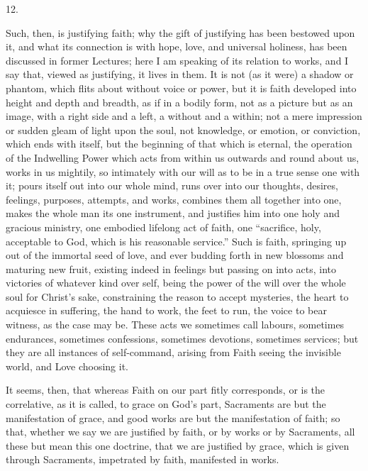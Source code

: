 12.

Such, then, is justifying faith; why the gift of justifying has
been bestowed upon it, and what its connection is with hope,
love, and universal holiness, has been discussed in former Lectures;
here I am speaking of its relation to works, and I say that, viewed as
justifying, it lives in them. It is not (as it were) a shadow or
phantom, which flits about without voice or power, but it is faith
developed into height and depth and breadth, as if in a bodily form,
not as a picture but as an image, with a right side and a left, a
without and a within; not a mere impression or sudden gleam of light
upon the soul, not knowledge, or emotion, or conviction, which ends
with itself, but the beginning of that which is eternal, the operation
of the Indwelling Power which acts from within us outwards and round
about us, works in us mightily, so intimately with our will as to be
in a true sense one with it; pours itself out into our whole mind,
runs over into our thoughts, desires, feelings, purposes, attempts,
and works, combines them all together into one, makes the whole man
its one instrument, and justifies him into one holy and gracious
ministry, one embodied lifelong act of faith, one ``sacrifice,
holy, acceptable to God, which is his reasonable service.'' Such
is faith, springing up out of the immortal seed of love, and ever
budding forth in new blossoms and maturing new fruit, existing indeed
in feelings but passing on into acts, into victories of whatever kind
over self, being the power of the will over the whole soul for
Christ's sake, constraining the reason to accept mysteries, the heart
to acquiesce in suffering, the hand to work, the feet to run, the
voice to bear witness, as the case may be. These acts we sometimes
call labours, sometimes endurances, sometimes confessions, sometimes
devotions, sometimes services; but they are all instances of
self-command, arising from Faith seeing the invisible world, and Love
choosing it.

It seems, then, that whereas Faith on our part fitly corresponds,
or is the correlative, as it is called, to grace on God's part,
Sacraments are but the manifestation of grace, and good works are but
the manifestation of faith; so that, whether we say we are justified
by faith, or by works or by Sacraments, all these but mean this one
doctrine, that we are justified by grace, which is given through
Sacraments, impetrated by faith, manifested in works.


